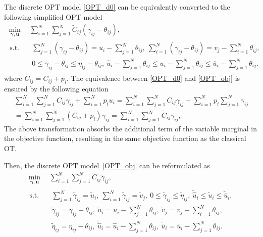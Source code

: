 \documentclass[review,hidelinks,onefignum,onetabnum]{siamart220329}
\begin{document}
The discrete OPT model \cref{OPT_d0} can be equivalently converted to the following simplified OPT model
\begin{equation}\label{OPT_obj}
\begin{gathered}
    \min_{\bm{\gamma},\bm{u}} \quad \sum_{i=1}^{N}\sum_{j=1}^{N} \widetilde{C}_{ij}(\gamma_{ij}-\theta_{ij}), \\
\begin{aligned}
    \mathrm{s.t.} & \quad \sum_{j=1}^{N} (\gamma_{ij}-\theta_{ij})=u_i-\sum_{j=1}^{N} \theta_{ij}, \ \sum_{i=1}^{N} (\gamma_{ij}-\theta_{ij})=v_j-\sum_{i=1}^{N} \theta_{ij}, \\ 
    & \quad 0\leq \gamma_{ij}-\theta_{ij}\leq \eta_{ij}-\theta_{ij}, \ \hat{u}_i-\sum_{j=1}^{N} \theta_{ij} \leq u_i-\sum_{j=1}^{N} \theta_{ij} \leq \overline{u}_i-\sum_{j=1}^{N} \theta_{ij}. 
\end{aligned}
\end{gathered}
\end{equation}
where $\widetilde{C}_{ij}= C_{ij}+p_i$.
The equivalence between \cref{OPT_d0} and \cref{OPT_obj} is ensured by the following equation
\begin{multline*}
    \sum_{i=1}^{N}\sum_{j=1}^{N} C_{ij}\gamma_{ij}+\sum_{i=1}^{N}p_i u_i
    = \sum_{i=1}^{N}\sum_{j=1}^{N} C_{ij}\gamma_{ij}+\sum_{i=1}^{N}p_i \sum_{j=1}^{N}\gamma_{ij} \\
    = \sum_{i=1}^{N}\sum_{j=1}^{N} \left( C_{ij}+p_i \right) \gamma_{ij}
    = \sum_{i=1}^{N}\sum_{j=1}^{N} \widetilde{C}_{ij} \gamma_{ij}, 
\end{multline*}
The above transformation absorbs the additional term of the variable marginal in the objective function, resulting in the same objective function as the classical OT.



Then, the discrete OPT model~\cref{OPT_obj} can be reformulated as
\begin{equation}\label{eq:theta}
\begin{gathered}
    \min_{\bm{\gamma},\bm{u}} \quad \sum_{i=1}^{N}\sum_{j=1}^{N} \widetilde{C}_{ij}\widetilde{\gamma}_{ij}, \\
\begin{aligned}
    \mathrm{s.t.} & \quad \sum_{j=1}^{N} \widetilde{\gamma}_{ij}=\widetilde{u}_i, \ \sum_{i=1}^{N} \widetilde{\gamma}_{ij}=\widetilde{v}_j, \
 0\leq \widetilde{\gamma}_{ij}\leq \widetilde{\eta}_{ij}, \ \widetilde{\hat{u}}_i \leq \widetilde{u}_i \leq \widetilde{\overline{u}}_i, \\
 &\quad  \widetilde{\gamma}_{ij}=\gamma_{ij}-\theta_{ij},\ \widetilde{u}_{i}=u_i-\sum_{j=1}^{N} \theta_{ij}, \ \widetilde{v}_{j}=v_j-\sum_{i=1}^{N} \theta_{ij},\\
 &\quad  \widetilde{\eta}_{ij}=\eta_{ij}-\theta_{ij},\
 \widetilde{\hat{u}}_{i}=\hat{u}_i-\sum_{j=1}^{N} \theta_{ij}, \ \widetilde{\overline{u}}_{i}=\overline{u}_i-\sum_{j=1}^{N} \theta_{ij}.
\end{aligned}
\end{gathered}
\end{equation}
\end{document}
